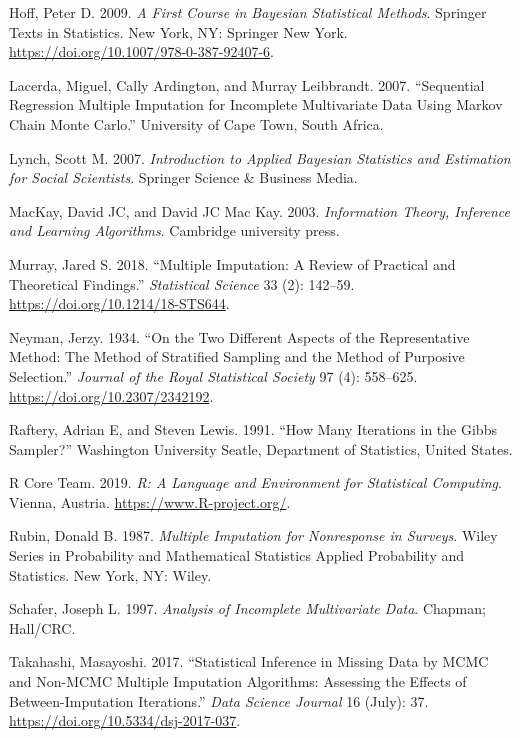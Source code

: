 \documentclass[
  Royal, times, sageapa]{sagej}
\begin{document}
\leavevmode\hypertarget{ref-hoff09}{}%
Hoff, Peter D. 2009. \emph{A First Course in Bayesian Statistical
Methods}. Springer Texts in Statistics. New York, NY: Springer New York.
\url{https://doi.org/10.1007/978-0-387-92407-6}.

\leavevmode\hypertarget{ref-lace07}{}%
Lacerda, Miguel, Cally Ardington, and Murray Leibbrandt. 2007.
``Sequential Regression Multiple Imputation for Incomplete Multivariate
Data Using Markov Chain Monte Carlo.'' University of Cape Town, South
Africa.

\leavevmode\hypertarget{ref-lync07}{}%
Lynch, Scott M. 2007. \emph{Introduction to Applied Bayesian Statistics
and Estimation for Social Scientists}. Springer Science \& Business
Media.

\leavevmode\hypertarget{ref-mack03}{}%
MacKay, David JC, and David JC Mac Kay. 2003. \emph{Information Theory,
Inference and Learning Algorithms}. Cambridge university press.

\leavevmode\hypertarget{ref-murr18}{}%
Murray, Jared S. 2018. ``Multiple Imputation: A Review of Practical and
Theoretical Findings.'' \emph{Statistical Science} 33 (2): 142--59.
\url{https://doi.org/10.1214/18-STS644}.

\leavevmode\hypertarget{ref-neym34}{}%
Neyman, Jerzy. 1934. ``On the Two Different Aspects of the
Representative Method: The Method of Stratified Sampling and the Method
of Purposive Selection.'' \emph{Journal of the Royal Statistical
Society} 97 (4): 558--625. \url{https://doi.org/10.2307/2342192}.

\leavevmode\hypertarget{ref-raft91}{}%
Raftery, Adrian E, and Steven Lewis. 1991. ``How Many Iterations in the
Gibbs Sampler?'' Washington University Seatle, Department of Statistics,
United States.

\leavevmode\hypertarget{ref-R}{}%
R Core Team. 2019. \emph{R: A Language and Environment for Statistical
Computing}. Vienna, Austria. \url{https://www.R-project.org/}.

\leavevmode\hypertarget{ref-rubin87}{}%
Rubin, Donald B. 1987. \emph{Multiple Imputation for Nonresponse in
Surveys}. Wiley Series in Probability and Mathematical Statistics
Applied Probability and Statistics. New York, NY: Wiley.

\leavevmode\hypertarget{ref-scha97}{}%
Schafer, Joseph L. 1997. \emph{Analysis of Incomplete Multivariate
Data}. Chapman; Hall/CRC.

\leavevmode\hypertarget{ref-taka17}{}%
Takahashi, Masayoshi. 2017. ``Statistical Inference in Missing Data by
MCMC and Non-MCMC Multiple Imputation Algorithms: Assessing the Effects
of Between-Imputation Iterations.'' \emph{Data Science Journal} 16
(July): 37. \url{https://doi.org/10.5334/dsj-2017-037}.
\end{document}
